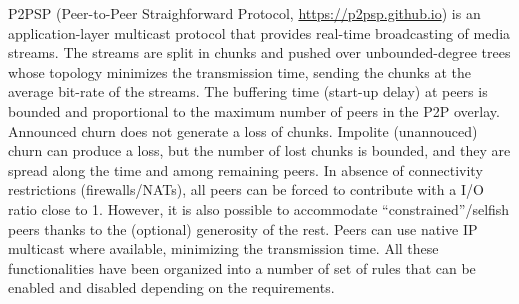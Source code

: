 

P2PSP (Peer-to-Peer Straighforward Protocol,
\url{https://p2psp.github.io}) is an application-layer multicast
protocol that provides real-time broadcasting of media streams. The
streams are split in chunks and pushed over unbounded-degree trees
whose topology minimizes the transmission time, sending the chunks at
the average bit-rate of the streams. The buffering time (start-up
delay) at peers is bounded and proportional to the maximum number of
peers in the P2P overlay. Announced churn does not generate a loss of
chunks. Impolite (unannouced) churn can produce a loss, but the number
of lost chunks is bounded, and they are spread along the time and
among remaining peers. In absence of connectivity restrictions
(firewalls/NATs), all peers can be forced to contribute with a I/O
ratio close to 1. However, it is also possible to accommodate
``constrained''/selfish peers thanks to the (optional) generosity of
the rest. Peers can use native IP multicast where available,
minimizing the transmission time. All these functionalities have been
organized into a number of set of rules that can be enabled and
disabled depending on the requirements.

